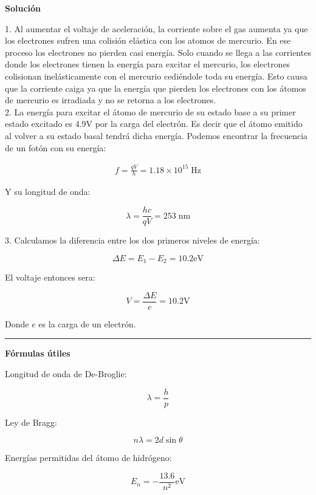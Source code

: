 \documentclass[12pt]{article}
\begin{document}
\begin{center}
	\textbf{Solución}
\end{center}

1. Al aumentar el voltaje de aceleración, la corriente sobre el gas aumenta ya que los electrones sufren una colisión elástica con los atomos de mercurio. En ese proceso los electrones no pierden casi energía. Solo cuando se llega a las corrientes donde los electrones tienen la energía para excitar el mercurio, los electrones colisionan inelásticamente con el mercurio cediéndole toda su energía. Esto causa que la corriente caiga ya que la energía que pierden los electrones con los átomos de mercurio es irradiada y no se retorna a los electrones.\\

2. La energía para excitar el átomo de mercurio de su estado base a su primer estado excitado es 4.9V por la carga del electrón. Es decir que el átomo emitido al volver a su estado basal tendrá dicha energía. Podemos encontrar la frecuencia de un fotón con su energía:

\begin{align*}
f = \frac{qV}{h} = 1.18 \times 10^{15} \;\text{Hz}
\end{align*}

Y su longitud de onda:

\begin{equation*}
\lambda = \frac{hc}{qV} = 253 \;\text{nm}
\end{equation*}

3. Calculamos la diferencia entre los dos primeros niveles de energía:

\begin{equation*}
\Delta E = E_1 - E_2 = 10.2 \text{eV}
\end{equation*}

El voltaje entonces sera:

\begin{equation*}
V = \frac{\Delta E}{e} = 10.2 \text{V}
\end{equation*}


Donde $e$ es la carga de un electrón.

\noindent\rule{16.5cm}{0.4pt}








\begin{center}
	\textbf{Fórmulas útiles}
\end{center}

Longitud de onda de De-Broglie:

\begin{equation*}
\lambda = \frac{h}{p}
\end{equation*}

Ley de Bragg:

\begin{equation}
n\lambda = 2 d \sin\theta
\end{equation}

Energías permitidas del átomo de hidrógeno:

\begin{equation*}
E_n = - \frac{13.6}{n^2} \text{eV}
\end{equation*}
\end{document}
